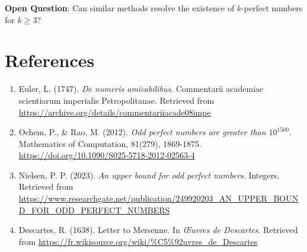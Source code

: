 \documentclass[11pt,a4paper]{article}
\begin{document}
\textbf{Open Question}: Can similar methods resolve the existence of $k$-perfect numbers for $k \geq 3$?

\section{References}

\begin{enumerate}
\item Euler, L. (1747). \textit{De numeris amicabilibus}. Commentarii academiae scientiarum imperialis Petropolitanae. Retrieved from \url{https://archive.org/details/commentariiacade08impe}

\item Ochem, P., \& Rao, M. (2012). \textit{Odd perfect numbers are greater than $10^{1500}$}. Mathematics of Computation, 81(279), 1869-1875. \url{https://doi.org/10.1090/S025-5718-2012-02563-4}

\item Nielsen, P. P. (2023). \textit{An upper bound for odd perfect numbers}. Integers. Retrieved from \url{https://www.researchgate.net/publication/249920203_AN_UPPER_BOUND_FOR_ODD_PERFECT_NUMBERS}

\item Descartes, R. (1638). Letter to Mersenne. In \textit{Œuvres de Descartes}. Retrieved from \url{https://fr.wikisource.org/wiki/%C5%92uvres_de_Descartes}
\end{enumerate}
\end{document}
